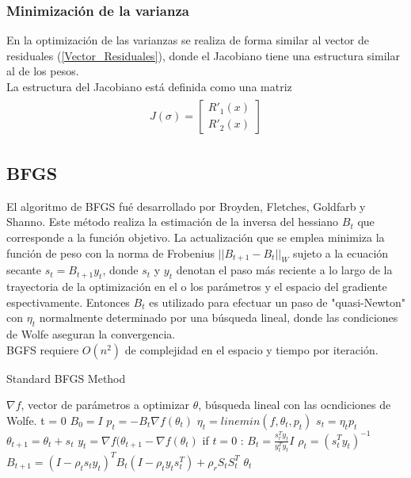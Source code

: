 \subsubsection{Minimizaci\'on de la varianza}
En la optimización de las varianzas se realiza de forma similar al vector de residuales (\ref{Vector_Residuales}), donde el Jacobiano tiene una estructura similar al de los pesos.\\
La estructura del Jacobiano está definida como una matriz 
\begin{align*}
\begin{split}
J(\sigma) = \begin{bmatrix}
	   	R'_1(x) \\    
		R'_2(x)      
           \end{bmatrix}
\end{split}
\end{align*}
\subsection{BFGS}
El algoritmo de BFGS fué desarrollado por Broyden, Fletches, Goldfarb y Shanno. Este método realiza la estimación de la inversa del hessiano $B_t$ que corresponde a la función objetivo.
La actualización que se emplea minimiza la función de peso con la norma de Frobenius $|| B_{t+1} - B_t ||_W$ sujeto a la ecuación secante $s_t = B_{t+1}y_t$, donde $s_t$ y $y_t$ denotan el paso más reciente a lo largo de la trayectoria de la optimización en el o los parámetros y el espacio del gradiente espectivamente.
 Entonces $B_t$ es utilizado para efectuar un paso de "quasi-Newton" con $\eta_t$ normalmente determinado por una búsqueda lineal, donde las condiciones de Wolfe aseguran la convergencia.\\
 BGFS requiere $O(n^2)$ de complejidad en el espacio y tiempo por iteración.  

\begin{algorithm}   
	\caption{Standard BFGS Method}  
	\label{alg1}
	\begin{algorithmic} 
		\REQUIRE $\nabla f$, vector de parámetros a optimizar $\theta$, búsqueda lineal con las ocndiciones de Wolfe.
		\STATE t = 0 
		\STATE $B_0 = I$
			\STATE $p_t = -B_t \nabla f(\theta_t)$
			\STATE $\eta_t = linemin(f,\theta_t, p_t)$
			\STATE $s_t = \eta_t p_t$
			\STATE $\theta_{t+1}= \theta_t + s_t$
			\STATE $y_t = \nabla f(\theta_{t+1} - \nabla f(\theta_t)$
			\STATE if $t=0$ : $B_t = \frac{s_r^T y_t}{y_t^T y_t} I$
			\STATE $\rho_t = (s_t^T y_t)^{-1}$
			\STATE $B_{t+1} = (I- \rho_t s_t y_t)^T B_t ( I - \rho_t y_t s_t^T)+\rho_r S_t S_t^T$
		\ENDWHILE
	\RETURN $\theta_t$
	\end{algorithmic}
\end{algorithm}
